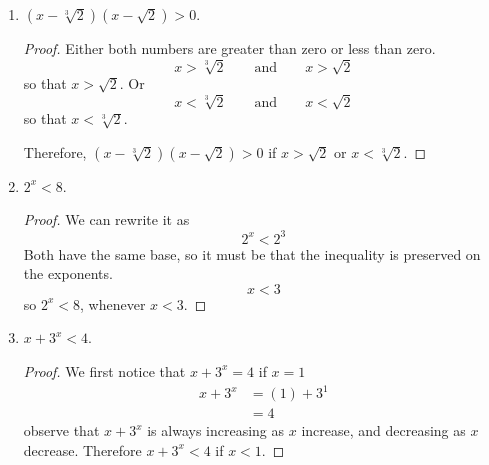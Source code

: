 \begin{exercise}[\textbf{4}]
\begin{enumerate}
         \item $(x-\sqrt[3]{2})(x-\sqrt{2})>0$. 
         \begin{proof} Either both numbers are greater than zero or less than zero.
              \begin{equation*}
                  x>\sqrt[3]{2} \qquad \text{and} \qquad x>\sqrt{2}
              \end{equation*}
              so that $x>\sqrt{2}$. Or 
              \begin{equation*}
                  x<\sqrt[3]{2} \qquad \text{and} \qquad x<\sqrt{2}
              \end{equation*}
              so that $x<\sqrt[3]{2}$.

              Therefore, $(x-\sqrt[3]{2})(x-\sqrt{2})>0$ if $x>\sqrt{2}$ or $x<\sqrt[3]{2}$.
         \end{proof}
         
         \item $2^x<8$.
         \begin{proof} We can rewrite it as 
            \begin{equation*}
                2^x < 2^3 
            \end{equation*}
            Both have the same base, so it must be that the inequality is
            preserved on the exponents.
            \begin{equation*}
                x<3
            \end{equation*}
            so $2^x < 8$, whenever $x<3$.
         \end{proof}
         
         \item $x+3^x<4$.
         \begin{proof} We first notice that $x+3^x=4$ if $x=1$
            \begin{align*}
                x+3^x &= (1)+3^1 \\
                &= 4
            \end{align*}
            observe that $x+3^x$ is always increasing as $x$ increase, and
            decreasing as $x$ decrease. Therefore $x+3^x < 4$ if $x<1$.
         \end{proof}


\end{enumerate}
\end{exercise}
